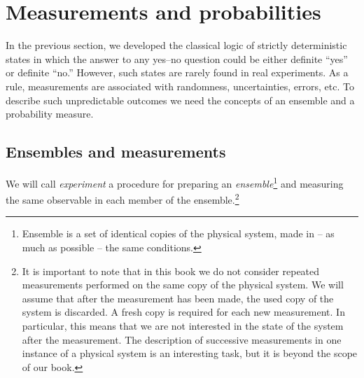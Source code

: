 \documentclass[nochecklpage]{stefan1}
\theoremstyle{definition}
\begin{document}
\vspace*{-3pt}
\section{Measurements and probabilities}\label{sc:measurements-and-probabilities}
\vspace*{-3pt}

In the previous section, we developed the classical logic of strictly
deterministic states in which the answer to any yes--no question could
be either definite ``yes'' or definite ``no.'' However, such states are
rarely found in real experiments. As a rule, measurements are associated
with randomness, uncertainties, errors, etc. To describe such
unpredictable outcomes we need the concepts of an ensemble and a
probability measure.

\vspace*{-3pt}
\subsection{Ensembles and measurements}\label{ss:quantum-case}
\vspace*{-3pt}

We will call \emph{experiment} a procedure for preparing
an \emph{ensemble}\footnote{Ensemble is a set of identical copies of the physical
system, made in -- as much as possible -- the same conditions.}
 and measuring the same observable in each member of the
ensemble.\footnote{It is important to note that in this book we do not
consider repeated measurements performed on the same copy of the
physical system. We will assume that after the measurement has been
made, the used copy of the system is discarded. A fresh copy is required
for each new measurement. In particular, this means that we are not
interested in the state of the system after the measurement. The
description of successive measurements in one instance of a physical
system is an interesting task, but it is beyond the scope of our book.\label{foot: repeat}}
\end{document}

